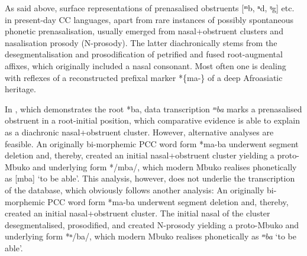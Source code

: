 \documentclass[output=paper]{langscibook}
\begin{document}
\begin{table}
\caption{‘guineafowl’ PCC *dzvna}
\small
\label{extab:wolff:15}

\end{table}

As said above, surface representations of prenasalised obstruents [ᵐb, ⁿd, ᵑg] etc. in present-day CC languages, apart from rare instances of possibly spontaneous phonetic prenasalisation, usually emerged from nasal+obstruent clusters and nasalisation prosody (N-prosody). The latter diachronically stems from the desegmentalisation and prosodification of petrified and fused root-augmental affixes, which originally included a nasal consonant. Most often one is dealing with reflexes of a reconstructed prefixal marker *\{ma-\} of a deep Afroasiatic heritage.

In , which demonstrates the root *ba, data transcription \textit{ᵐba} marks a prenasalised obstruent in a root-initial position, which comparative evidence is able to explain as a diachronic nasal+obstruent cluster. However, alternative analyses are feasible. An originally bi-morphemic PCC word form *ma-ba underwent segment deletion and, thereby, created an initial nasal+obstruent cluster yielding a proto-Mbuko and underlying form */mba/, which modern Mbuko realises phonetically as [mba] ‘to be able’. This analysis, however, does not underlie the transcription of the database, which obviously follows another analysis: An originally bi-morphemic PCC word form *ma-ba underwent segment deletion and, thereby, created an initial nasal+obstruent cluster. The initial nasal of the cluster desegmentalised, prosodified, and created N-prosody yielding a proto-Mbuko and underlying form *ⁿ/ba/, which modern Mbuko realises phonetically as \textit{ᵐba} ‘to be able’.
\end{document}
